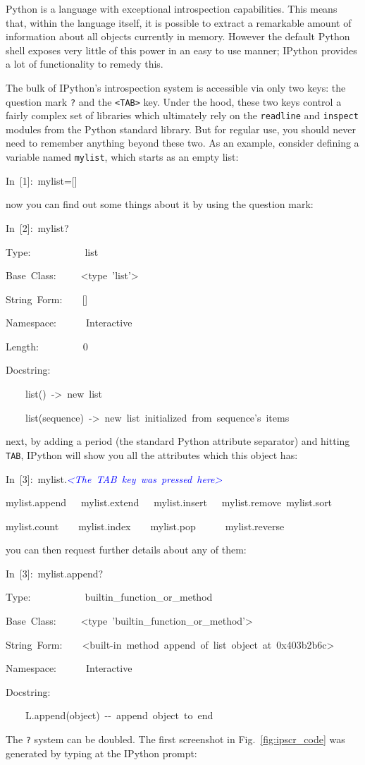 Python is a language with exceptional introspection capabilities.
This means that, within the language itself, it is possible to extract
a remarkable amount of information about all objects currently in
memory. However the default Python shell exposes very little of this
power in an easy to use manner; IPython provides a lot of functionality
to remedy this.

The bulk of IPython's introspection system is accessible via only
two keys: the question mark \texttt{?} and the \texttt{<TAB>} key.
Under the hood, these two keys control a fairly complex set of libraries
which ultimately rely on the \texttt{readline} and \texttt{inspect}
modules from the Python standard library. But for regular use, you
should never need to remember anything beyond these two. As an example,
consider defining a variable named \texttt{mylist}, which starts as
an empty list:

\begin{lyxcode}
In~{[}1]:~mylist={[}]
\end{lyxcode}
now you can find out some things about it by using the question mark:

\begin{lyxcode}
In~{[}2]:~mylist?

Type:~~~~~~~~~~~list

Base~Class:~~~~~<type~'list'>

String~Form:~~~~{[}]

Namespace:~~~~~~Interactive

Length:~~~~~~~~~0

Docstring:

~~~~list()~->~new~list

~~~~list(sequence)~->~new~list~initialized~from~sequence's~items
\end{lyxcode}
next, by adding a period (the standard Python attribute separator)
and hitting \texttt{TAB}, IPython will show you all the attributes
which this object has:

\begin{lyxcode}
In~{[}3]:~mylist.\textcolor{blue}{\emph{<The~TAB~key~was~pressed~here>}}

mylist.append~~~mylist.extend~~~mylist.insert~~~mylist.remove~mylist.sort

mylist.count~~~~mylist.index~~~~mylist.pop~~~~~~mylist.reverse
\end{lyxcode}
you can then request further details about any of them:

\begin{lyxcode}
In~{[}3]:~mylist.append?

Type:~~~~~~~~~~~builtin\_function\_or\_method

Base~Class:~~~~~<type~'builtin\_function\_or\_method'>

String~Form:~~~~<built-in~method~append~of~list~object~at~0x403b2b6c>

Namespace:~~~~~~Interactive

Docstring:

~~~~L.append(object)~-{}-~append~object~to~end
\end{lyxcode}
The \texttt{?} system can be doubled. The first screenshot in Fig.~\ref{fig:ipscr_code}
was generated by typing at the IPython prompt: 

